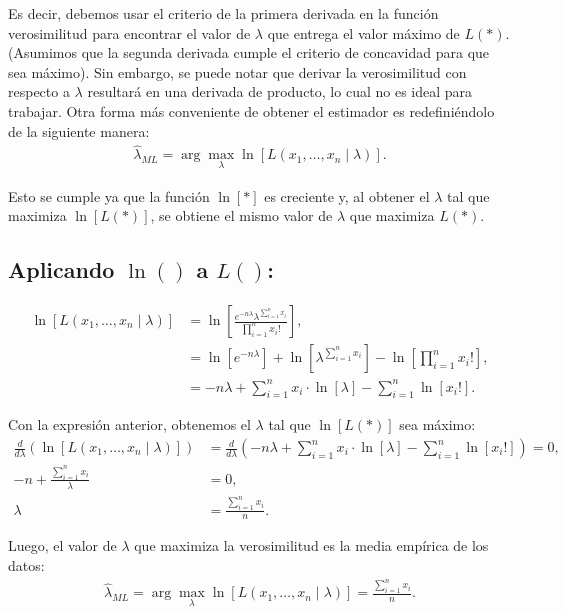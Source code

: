 \documentclass[
  11pt,
  letterpaper,
   addpoints,
  ]{exam}
\begin{document}
\begin{questions}
\begin{solution}
Es decir, debemos usar el criterio de la primera derivada en la función verosimilitud para encontrar el valor de \(\lambda\) que entrega el valor máximo de \(L(*)\). (Asumimos que la segunda derivada cumple el criterio de concavidad para que sea máximo). Sin embargo, se puede notar que derivar la verosimilitud con respecto a \(\lambda\) resultará en una derivada de producto, lo cual no es ideal para trabajar. Otra forma más conveniente de obtener el estimador es redefiniéndolo de la siguiente manera:
\begin{align}
\hat{\lambda}_{ML} = \arg \max_{\lambda} \ln[L(x_1, \ldots, x_n \mid \lambda)].
\end{align}

Esto se cumple ya que la función \(\ln[*]\) es creciente y, al obtener el \(\lambda\) tal que maximiza \(\ln[L(*)]\), se obtiene el mismo valor de \(\lambda\) que maximiza \(L(*)\).

\subsection*{Aplicando \(\ln()\) a \(L()\):}

\begin{align}
\ln[L(x_1, \ldots, x_n \mid \lambda)] 
    &= \ln \left[ \frac{e^{-n\lambda} \lambda^{\sum_{i=1}^n x_i}}{\prod_{i=1}^n x_i!} \right], \\
    &= \ln[e^{-n\lambda}] + \ln[\lambda^{\sum_{i=1}^n x_i}] - \ln \left[\prod_{i=1}^n x_i! \right], \\
    &= -n\lambda + \sum_{i=1}^n x_i \cdot \ln[\lambda] - \sum_{i=1}^n \ln[x_i!].
\end{align}

Con la expresión anterior, obtenemos el \(\lambda\) tal que \(\ln[L(*)]\) sea máximo:
\begin{align}
\frac{d}{d\lambda} \left( \ln[L(x_1, \ldots, x_n \mid \lambda)] \right) 
    &= \frac{d}{d\lambda} \left( -n\lambda + \sum_{i=1}^n x_i \cdot \ln[\lambda] - \sum_{i=1}^n \ln[x_i!] \right) = 0, \\
-n + \frac{\sum_{i=1}^n x_i}{\lambda} &= 0, \\
\lambda &= \frac{\sum_{i=1}^n x_i}{n}.
\end{align}

Luego, el valor de \(\lambda\) que maximiza la verosimilitud es la media empírica de los datos:
\begin{align}
\hat{\lambda}_{ML} = \arg \max_{\lambda} \ln[L(x_1, \ldots, x_n \mid \lambda)] = \frac{\sum_{i=1}^n x_i}{n}.
\end{align}

\end{solution}
\end{questions}
\end{document}
